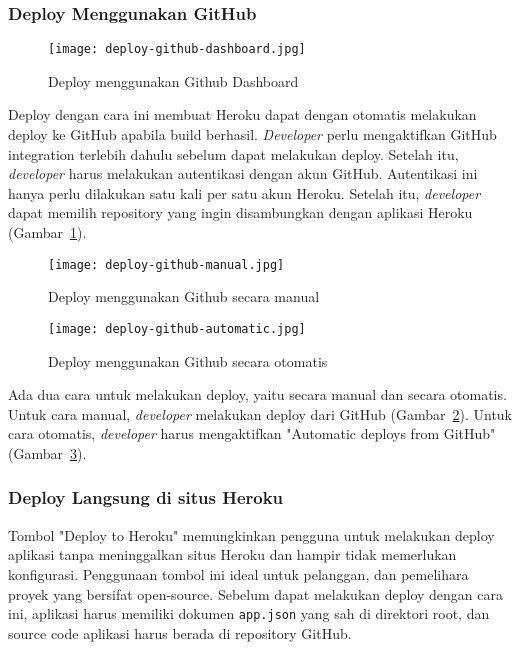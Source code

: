 \subsubsection{Deploy Menggunakan GitHub}
\begin{figure}[H]
	\centering  
	\texttt{[image: deploy-github-dashboard.jpg]}  
	\caption[Deploy menggunakan Github Dashboard]{Deploy menggunakan Github Dashboard} 
	\label{fig:deploy-github-dashboard} 
\end{figure}
Deploy dengan cara ini membuat Heroku dapat dengan otomatis melakukan deploy ke GitHub apabila build berhasil. \textit{Developer} perlu mengaktifkan GitHub integration terlebih dahulu sebelum dapat melakukan deploy. Setelah itu, \textit{developer} harus melakukan autentikasi dengan akun GitHub. Autentikasi ini hanya perlu dilakukan satu kali per satu akun Heroku. Setelah itu, \textit{developer} dapat memilih repository yang ingin disambungkan dengan aplikasi Heroku (Gambar~\ref{fig:deploy-github-dashboard}).

\begin{figure}[H]
	\centering  
	\texttt{[image: deploy-github-manual.jpg]}  
	\caption[Deploy menggunakan Github secara manual]{Deploy menggunakan Github secara manual} 
	\label{fig:deploy-github-manual} 
\end{figure}
\begin{figure}[H]
	\centering  
	\texttt{[image: deploy-github-automatic.jpg]}  
	\caption[Deploy menggunakan Github secara otomatis]{Deploy menggunakan Github secara otomatis} 
	\label{fig:deploy-github-automatic} 
\end{figure}
Ada dua cara untuk melakukan deploy, yaitu secara manual dan secara otomatis. Untuk cara manual, \textit{developer} melakukan deploy dari GitHub (Gambar~\ref{fig:deploy-github-manual}). Untuk cara otomatis, \textit{developer} harus mengaktifkan "Automatic deploys from GitHub" (Gambar~\ref{fig:deploy-github-automatic}).

\subsubsection{Deploy Langsung di situs Heroku}
Tombol "Deploy to Heroku" memungkinkan pengguna untuk melakukan deploy aplikasi tanpa meninggalkan situs Heroku dan hampir tidak memerlukan konfigurasi. Penggunaan tombol ini ideal untuk pelanggan, dan pemelihara proyek yang bersifat open-source. Sebelum dapat melakukan deploy dengan cara ini, aplikasi harus memiliki dokumen \texttt{app.json} yang sah di direktori root, dan source code aplikasi harus berada di repository GitHub.

